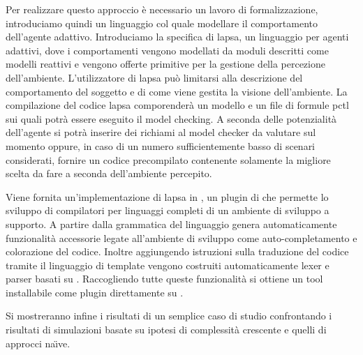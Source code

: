 Per realizzare questo approccio è necessario un lavoro di formalizzazione, introduciamo quindi un linguaggio col quale modellare il comportamento dell'agente adattivo. Introduciamo la specifica di \ac{lapsa}, un linguaggio per agenti adattivi, dove i comportamenti vengono modellati da moduli descritti come modelli reattivi e vengono offerte primitive per la gestione della percezione dell'ambiente. L'utilizzatore di \ac{lapsa} può limitarsi alla descrizione del comportamento del soggetto e di come viene gestita la visione dell'ambiente. La compilazione del codice \ac{lapsa} comporenderà un modello \prism{} e un file di formule \ac{pctl} sui quali potrà essere eseguito il model checking. A seconda delle potenzialità dell'agente si potrà inserire dei richiami al model checker da valutare sul momento oppure, in caso di un numero sufficientemente basso di scenari considerati, fornire un codice precompilato contenente solamente la migliore scelta da fare a seconda dell'ambiente percepito.

Viene fornita un'implementazione di \ac{lapsa} in \xtext{} \cite{xtext}, un plugin di \eclipse{} che permette lo sviluppo di compilatori per linguaggi completi di un ambiente di sviluppo a supporto. A partire dalla grammatica del linguaggio \xtext{} genera automaticamente funzionalità accessorie legate all'ambiente di sviluppo come auto-completamento e colorazione del codice. Inoltre aggiungendo istruzioni sulla traduzione del codice tramite il linguaggio di template \xtend{} \cite{xtend}
vengono costruiti automaticamente lexer e parser basati su \antlr{} \cite{Parr95antlr:a}.
Raccogliendo tutte queste funzionalità si ottiene un tool installabile come plugin direttamente su \eclipse{}.

Si mostreranno infine i risultati di un semplice caso di studio confrontando i risultati di simulazioni basate su ipotesi di complessità crescente e quelli di approcci na\"{\i}ve.